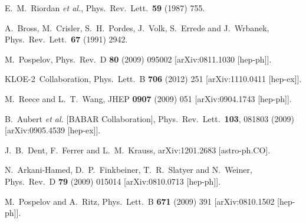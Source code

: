 E.~M.~Riordan {\it et al.},
Phys.\ Rev.\ Lett.\ {\bf 59} (1987) 755.

A.~Bross, M.~Crisler, S.~H.~Pordes, J.~Volk, S.~Errede and J.~Wrbanek,
Phys.\ Rev.\ Lett.\ {\bf 67} (1991) 2942.


M.~Pospelov,
Phys.\ Rev.\ D {\bf 80} (2009) 095002
[arXiv:0811.1030 [hep-ph]].

KLOE-2~Collaboration,
Phys.\ Lett.\ B {\bf 706} (2012) 251
[arXiv:1110.0411 [hep-ex]].

M.~Reece and L.~T.~Wang,
JHEP {\bf 0907} (2009) 051
[arXiv:0904.1743 [hep-ph]].

  B.~Aubert {\it et al.}  [BABAR Collaboration], Phys.\ Rev.\ Lett.\  {\bf 103}, 081803 (2009) [arXiv:0905.4539 [hep-ex]].

J.~B.~Dent, F.~Ferrer and L.~M.~Krauss,
arXiv:1201.2683 [astro-ph.CO].


N.~Arkani-Hamed, D.~P.~Finkbeiner, T.~R.~Slatyer and N.~Weiner,
Phys.\ Rev.\ D {\bf 79} (2009) 015014
[arXiv:0810.0713 [hep-ph]].

M.~Pospelov and A.~Ritz,
Phys.\ Lett.\ B {\bf 671} (2009) 391
[arXiv:0810.1502 [hep-ph]].


